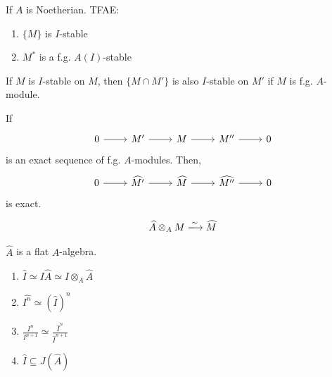 \documentclass[oneside, 12pt]{scrbook}
\newcommand{\ds}{\displaystyle}
\theoremstyle{theorem}
\begin{document}
\begin{lemma}
If $A$ is Noetherian. TFAE:
\begin{enumerate}
\item $\{M\}$ is $I$-stable
\item $M^*$ is a f.g. $A(I)$-stable
\end{enumerate}
\end{lemma}

\begin{theorem}
If $M$ is $I$-stable on $M$, then $\{M \cap M'\}$ is also $I$-stable on $M'$ if $M$ is f.g. $A$-module.
\end{theorem}

\begin{theorem}
If \[\begin{tikzcd}
	0 & {M'} & M & {M''} & 0
	\arrow[from=1-3, to=1-4]
	\arrow[from=1-4, to=1-5]
	\arrow[from=1-2, to=1-3]
	\arrow[from=1-1, to=1-2]
\end{tikzcd}\]
 is an exact sequence of f.g. $A$-modules. Then, 
 \[\begin{tikzcd}
	0 & {\widehat{M'}} & {\widehat{M}} & {\widehat{M''}} & 0
	\arrow[from=1-3, to=1-4]
	\arrow[from=1-4, to=1-5]
	\arrow[from=1-2, to=1-3]
	\arrow[from=1-1, to=1-2]
\end{tikzcd}\]
is exact.
\end{theorem}

\begin{theorem}
\begin{equation}
\widehat{A} \otimes_{A} M \xlongrightarrow{\sim} \widehat{M}
\end{equation}
\end{theorem}

\begin{corollary}
$\widehat{A}$ is a flat $A$-algebra.
\end{corollary}

\begin{theorem}
\begin{enumerate}
\item $\widehat{I} \simeq I\widehat{A} \simeq I \otimes_{A} \widehat{A}$
\item $\widehat{I^n} \simeq (\widehat{I})^n$
\item $\ds{\frac{I^n}{I^{n+1}} \simeq \frac{\widehat{I}^n}{\widehat{I}^{n+1}}}$
\item $\widehat{I} \subseteq J(\widehat{A})$
\end{enumerate}
\end{theorem}
\end{document}
